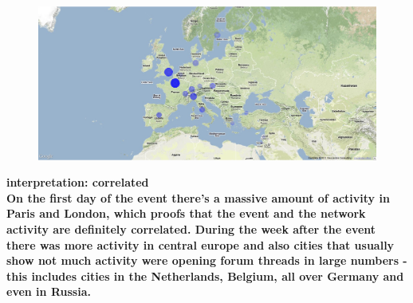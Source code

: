 \documentclass[11pt,a4paper,english]{article}
\begin{document}
\begin{itemize}
\begin{figure}[H]
\begin{center}
							\includegraphics[width=130mm]{img/post-london}
						\end{center}					
						\vspace{-5pt}
					\end{figure}
					
					\bf interpretation: \rm correlated
					\\ On the first day of the event there's a massive amount of activity in Paris and London, which proofs that the event and the network activity are definitely correlated. During the week after the event there was more activity in central europe and also cities that usually show not much activity were opening forum threads in large numbers - this includes cities in the Netherlands, Belgium, all over Germany and even in Russia.


\end{itemize}
\end{document}
